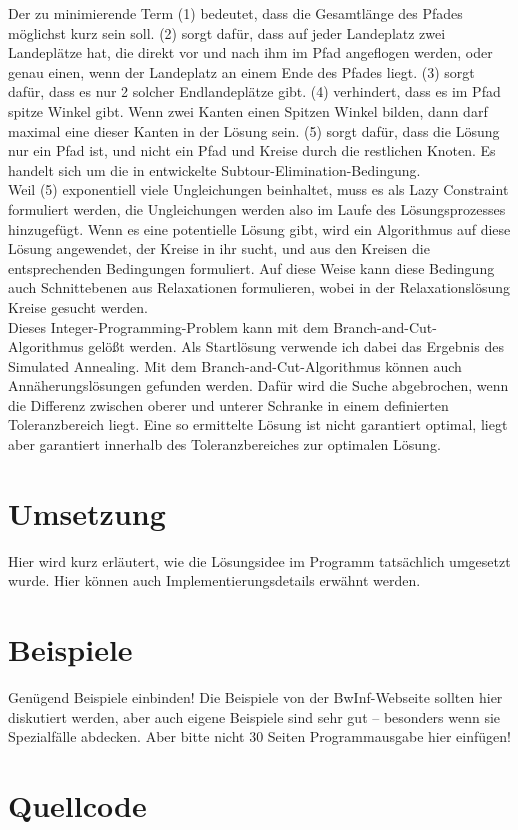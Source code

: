 \documentclass[a4paper,10pt,ngerman]{scrartcl}
\begin{document}
Der zu minimierende Term (1) bedeutet, dass die Gesamtlänge des Pfades möglichst kurz sein soll. (2) sorgt dafür, dass auf jeder Landeplatz
zwei Landeplätze hat, die direkt vor und nach ihm im Pfad angeflogen werden, oder genau einen, wenn der Landeplatz an einem Ende des Pfades liegt.
(3) sorgt dafür, dass es nur 2 solcher Endlandeplätze gibt. (4) verhindert, dass es im Pfad spitze Winkel gibt. Wenn zwei Kanten einen Spitzen
Winkel bilden, dann darf maximal eine dieser Kanten in der Lösung sein. (5) sorgt dafür, dass die Lösung nur ein Pfad ist, und nicht ein Pfad und
Kreise durch die restlichen Knoten. Es handelt sich um die in \cite{dantzig_1954} entwickelte Subtour-Elimination-Bedingung.\\
Weil (5) exponentiell viele Ungleichungen beinhaltet, muss es als Lazy Constraint formuliert werden, die Ungleichungen werden also im Laufe des Lösungsprozesses
hinzugefügt. Wenn es
eine potentielle Lösung gibt, wird ein Algorithmus auf diese Lösung angewendet, der Kreise in ihr sucht, und aus den Kreisen die entsprechenden Bedingungen
formuliert. Auf diese Weise kann diese Bedingung auch Schnittebenen aus Relaxationen formulieren, wobei in der Relaxationslösung Kreise gesucht werden. \\
Dieses Integer-Programming-Problem kann mit dem Branch-and-Cut-Algorithmus \cite{padberg_1991} gelößt werden. Als Startlösung verwende ich dabei das Ergebnis des Simulated Annealing.
Mit dem Branch-and-Cut-Algorithmus können auch Annäherungslösungen gefunden werden. Dafür wird die Suche abgebrochen, wenn die Differenz zwischen oberer und unterer Schranke
in einem definierten Toleranzbereich liegt. Eine so ermittelte Lösung ist nicht garantiert optimal, liegt aber garantiert innerhalb des Toleranzbereiches zur optimalen Lösung.
\section{Umsetzung}
Hier wird kurz erläutert, wie die Lösungsidee im Programm tatsächlich umgesetzt
wurde. Hier können auch Implementierungsdetails erwähnt werden.

\section{Beispiele}
Genügend Beispiele einbinden! Die Beispiele von der BwInf-Webseite sollten hier
diskutiert werden, aber auch eigene Beispiele sind sehr gut – besonders wenn
sie Spezialfälle abdecken. Aber bitte nicht 30 Seiten Programmausgabe hier
einfügen!

\section{Quellcode}

\begingroup
\def\chapter*#1{}

\endgroup
\end{document}
